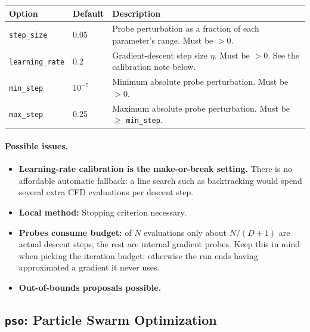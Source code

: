 \begin{center}
\begin{tabular}{@{}llp{8.5cm}@{}}
\toprule
Option & Default & Description \\
\midrule
\texttt{step\_size} & 0.05 & Probe perturbation as a fraction of each
parameter's range. Must be $>0$. \\
\texttt{learning\_rate} & 0.2 & Gradient-descent step size $\eta$. Must be
$>0$.  See the calibration note below. \\
\texttt{min\_step} & $10^{-5}$ & Minimum absolute probe perturbation. Must
be $>0$. \\
\texttt{max\_step} & 0.25 & Maximum absolute probe perturbation. Must be
$\geq$ \texttt{min\_step}. \\
\bottomrule
\end{tabular}
\end{center}

\paragraph{Possible issues.}
\begin{itemize}
  \item \textbf{Learning-rate calibration is the make-or-break setting.}
        There is no affordable automatic fallback: a line search such as backtracking would spend several
        extra CFD evaluations per descent step.
  \item \textbf{Local method:} Stopping criterion necessary.
  \item \textbf{Probes consume budget:} of $N$ evaluations only about
        $N/(D{+}1)$ are actual descent steps; the rest are internal gradient
        probes.  Keep this in mind when picking the iteration budget:
        otherwise the run ends having approximated a gradient it never
        uses.
  \item \textbf{Out-of-bounds proposals possible.}
\end{itemize}

\subsection{\texttt{pso}: Particle Swarm Optimization}
\label{sec:opt-pso}

